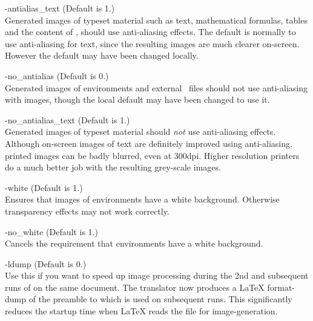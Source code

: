 \begin{htmllist}
\begin{changebar}
%
\item [ -antialias\_text\label{cs_aaliastext}]
 (Default is 1.)\\
Generated images of typeset material such as text, mathematical formulas,
tables and the content of  ,
should use anti-aliasing effects.\html{\\}
The default is normally to use anti-aliasing for text,
since the resulting images are much clearer on-screen.
However the default may have been changed locally.


%
\item [ -no\_antialias\label{cs_noaalias}]
 (Default is 0.)\\
Generated images of  environments and external \PS\ files
should not use anti-aliasing with images,
though the local default may have been changed to use it.


%
\item [ -no\_antialias\_text\label{cs_noaaliastext}]
 (Default is 1.)\\
Generated images of typeset material should \emph{not} use anti-aliasing effects.
Although on-screen images of text are definitely improved using anti-aliasing,
printed images can be badly blurred, even at 300dpi.
Higher resolution printers do a much better job with the resulting grey-scale images.
\end{changebar}
%

\begin{changebar}
%
\item [ -white\label{cs_white}]
 (Default is 1.)\\
Ensures that images of  environments have a white
background. Otherwise transparency effects may not work correctly.

\item [ -no\_white\label{cs_nowhite}]
 (Default is 1.)\\
Cancels the requirement that  environments have a white background.


%
\item [ -ldump\label{cs_ldump}]
 (Default is 0.)\\
Use this if you want to speed up image processing during the 2nd
and subsequent runs of \latextohtml{} on the same document.
The translator now produces a \LaTeX{} format-dump of the preamble to
 which is used on subsequent runs.
This significantly reduces the startup time when
\LaTeX{} reads the  file for image-generation.


\end{changebar}
\end{htmllist}

